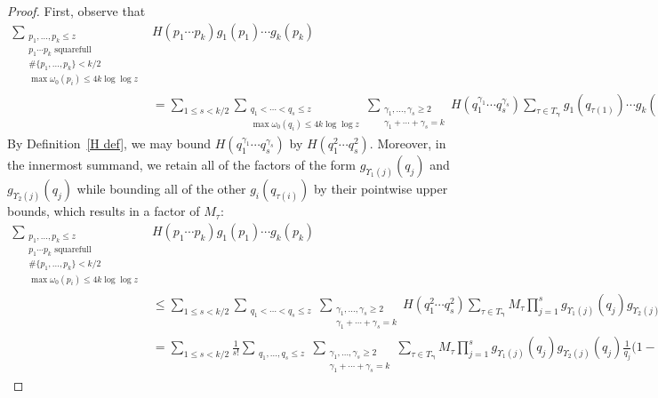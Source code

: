 \documentclass[12pt,reqno]{amsart}
\theoremstyle{definition}
\newcommand{\bgamma}{{\bm\gamma}}
\begin{document}
\begin{proof}
First, observe that
\begin{align*}
\sum_{\substack{p_1,\dots,p_k \leq z \\ p_1\cdots p_k \text{ squarefull} \\ \#\{p_1,\dots,p_k\} < k/2 \\ \max \omega_0(p_i) \le 4k\log\log z}} & H(p_1\cdots p_k) g_1(p_1) \cdots g_k(p_k) \\
&= \sum_{1\le s<k/2} \sum_{\substack{q_1 < \cdots < q_s \le z \\ \max \omega_0(q_i) \le 4k\log\log z}} \sum_{\substack{\gamma_1,\dots,\gamma_s\ge2 \\ \gamma_1+\cdots+\gamma_s=k}} H(q_1^{\gamma_1}\cdots q_s^{\gamma_s}) \sum_{\tau\in T_\bgamma} g_1(q_{\tau(1)}) \cdots g_k(q_{\tau(k)}).
\end{align*}
By Definition~\ref{H def}, we may bound $H(q_1^{\gamma_1}\cdots q_s^{\gamma_s})$ by $H(q_1^2\cdots q_s^2)$. Moreover, in the innermost summand, we retain all of the factors of the form $g_{\Upsilon_1(j)}(q_j)$ and $g_{\Upsilon_2(j)}(q_j)$ while bounding all of the other $g_i(q_{\tau(i)})$ by their pointwise upper bounds, which results in a factor of $M_\tau$:
\begin{align*}
\sum_{\substack{p_1,\dots,p_k \leq z \\ p_1\cdots p_k \text{ squarefull} \\ \#\{p_1,\dots,p_k\} < k/2 \\ \max \omega_0(p_i) \le 4k\log\log z}} & H(p_1\cdots p_k) g_1(p_1) \cdots g_k(p_k) \\
&\le \sum_{1\le s<k/2} \sum_{\substack{q_1 < \cdots < q_s \le z}} \sum_{\substack{\gamma_1,\dots,\gamma_s\ge2 \\ \gamma_1+\cdots+\gamma_s=k}} H(q_1^2\cdots q_s^2) \sum_{\tau\in T_\bgamma} M_\tau \prod_{j=1}^s g_{\Upsilon_1(j)}(q_j) g_{\Upsilon_2(j)}(q_j) \\
&= \sum_{1\le s<k/2} \frac1{s!} \sum_{\substack{ q_1,\dots,q_s \le z}} \sum_{\substack{\gamma_1,\dots,\gamma_s\ge2 \\ \gamma_1+\cdots+\gamma_s=k}} \sum_{\tau\in T_\bgamma} M_\tau \prod_{j=1}^s g_{\Upsilon_1(j)}(q_j) g_{\Upsilon_2(j)}(q_j) \frac{1}{q_j} \bigg( 1 - \frac{1}{q_j} \bigg).
\end{align*}

\end{proof}
\end{document}
